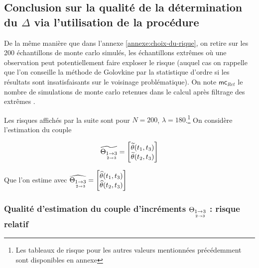 

\subsection{Conclusion sur la qualité de la détermination du $\Delta$ via l'utilisation de la procédure}

\noindent De la même manière que dans l'annexe \ref{annexe:choix-du-rique}, on retire sur les 200 échantillons de monte carlo simulés, les échantillons \og extrêmes \fg où une observation peut potentiellement faire exploser le risque (auquel cas on rappelle que l'on conseille la méthode de Golovkine par la statistique d'ordre si les résultats sont insatisfaisants sur le voisinage problématique). On note $\textsf{mc}_{Ret}$ le nombre de simulations de monte carlo retenues dans le calcul après filtrage des \og extrêmes \fg.

\bigskip

\noindent Les risques affichés par la suite sont pour $N=200$, $\lambda = 180$.\footnote{Les tableaux de risque pour les autres valeurs mentionnées précédemment sont disponibles en annexe} On considère l'estimation du couple

\begin{minipage}{0.45\textwidth}
	\begin{equation*}
		\widetilde {\Theta_{\underset{2 \rightarrow 3}{1 \rightarrow 3}}} = \begin{bmatrix} \widetilde \theta(t_1, t_3)\\ \widetilde \theta(t_2, t_3) \end{bmatrix}
	\end{equation*}
\end{minipage}
\begin{minipage}{0.45\textwidth}
	Que l'on estime avec $\widehat {\Theta_{\underset{2 \rightarrow 3}{1 \rightarrow 3}}} = \begin{bmatrix} \widehat \theta(t_1, t_3)\\ \widehat \theta(t_2, t_3) \end{bmatrix}$
\end{minipage}

\bigskip

\subsubsection{Qualité d'estimation du couple d'incréments $\Theta_{\underset{2 \rightarrow 3}{1 \rightarrow 3}}$ : risque relatif}

